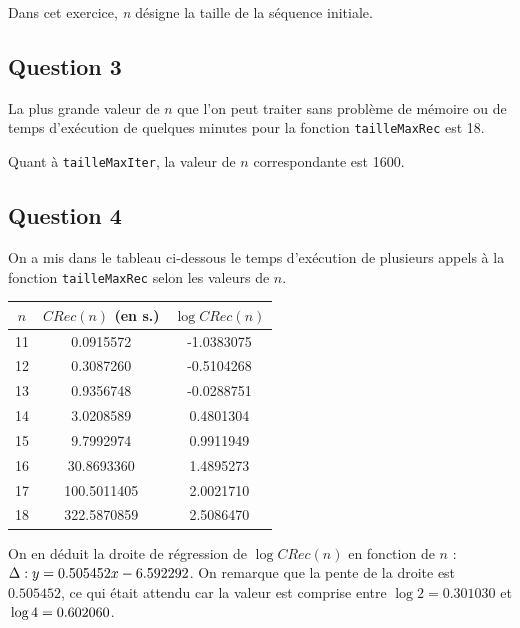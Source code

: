 \documentclass[12pt,a4paper]{article}
\begin{document}
Dans cet exercice, {\itshape n} d\'esigne la taille de la s\'equence initiale.

\subsection*{Question 3}
La plus grande valeur de $n$ que l'on peut traiter sans probl\`eme de m\'emoire ou de temps d'ex\'ecution de quelques minutes pour la fonction \texttt{tailleMaxRec} est 18. 

Quant \`a \texttt{tailleMaxIter}, la valeur de $n$ correspondante est 1600.

\subsection*{Question 4}
On a mis dans le tableau ci-dessous le temps d'ex\'ecution de plusieurs appels \`a la fonction \texttt{tailleMaxRec} selon les valeurs de $n$.
	\begin{center}
	\begin{tabular}{|c|cc|}
	\hline $n$ & $CRec(n)$ (en s.) & $\log CRec(n)$ \\
	\hline 11 &   0.0915572 & -1.0383075 \\ 
	\hline 12 &   0.3087260 & -0.5104268 \\ 
	\hline 13 &   0.9356748 & -0.0288751 \\ 
	\hline 14 &   3.0208589 &  0.4801304 \\
	\hline 15 &   9.7992974 &  0.9911949 \\ 
	\hline 16 &  30.8693360 &  1.4895273 \\ 
	\hline 17 & 100.5011405 &  2.0021710 \\
	\hline 18 & 322.5870859 &  2.5086470 \\
	\hline
	\end{tabular}
	\end{center}
	
	On en d\'eduit la droite de r\'egression de $\log CRec(n)$ en fonction de $n$ : $\\\Delta : y = 0.505452x - 6.592292$. On remarque que la pente de la droite est $0.505452$, ce qui \'etait attendu car la valeur est comprise entre $\log 2 = 0.301030$ et $\\\log 4 = 0.602060$. 

\newpage
\end{document}
